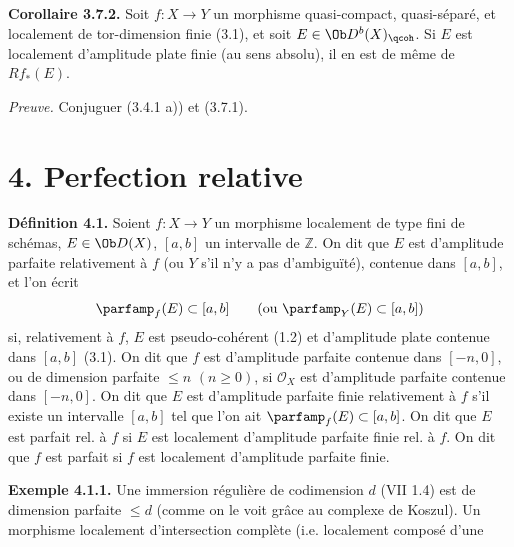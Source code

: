 \textbf{Corollaire 3.7.2.} Soit \(f:X\to Y\) un morphisme quasi-compact, quasi-séparé, et localement de tor-dimension finie (3.1), et soit \(E\in\Ob D^b(X)_{\qcoh}\). Si \(E\) est localement d'amplitude plate finie (au sens absolu), il en est de même de \(Rf_*(E)\).

\emph{Preuve.} Conjuguer (3.4.1 a)) et (3.7.1).

\section*{4. Perfection relative}

\textbf{Définition 4.1.} Soient \(f:X\to Y\) un morphisme localement de type fini de schémas, \(E\in\Ob D(X)\), \([a,b]\) un intervalle de \(\mathbb Z\). On dit que \(E\) est d'amplitude parfaite relativement à \(f\) (ou \(Y\) s'il n'y a pas d'ambiguïté), contenue dans \([a,b]\), et l'on écrit
\[
 \parfamp_f(E)\subset[a,b]\qquad(\text{ou }\parfamp_Y(E)\subset[a,b])
\]
si, relativement à \(f\), \(E\) est pseudo-cohérent (1.2) et d'amplitude plate contenue dans \([a,b]\) (3.1). On dit que \(f\) est d'amplitude parfaite contenue dans \([-n,0]\), ou de dimension parfaite \(\leq n\) \((n\geq0)\), si \(\mathcal O_X\) est d'amplitude parfaite contenue dans \([-n,0]\). On dit que \(E\) est d'amplitude parfaite finie relativement à \(f\) s'il existe un intervalle \([a,b]\) tel que l'on ait \(\parfamp_f(E)\subset[a,b]\). On dit que \(E\) est parfait rel. à \(f\) si \(E\) est localement d'amplitude parfaite finie rel. à \(f\). On dit que \(f\) est parfait si \(f\) est localement d'amplitude parfaite finie.

\textbf{Exemple 4.1.1.} Une immersion régulière de codimension \(d\) (VII 1.4) est de dimension parfaite \(\leq d\) (comme on le voit grâce au complexe de Koszul). Un morphisme localement d'intersection complète (i.e. localement composé d'une
